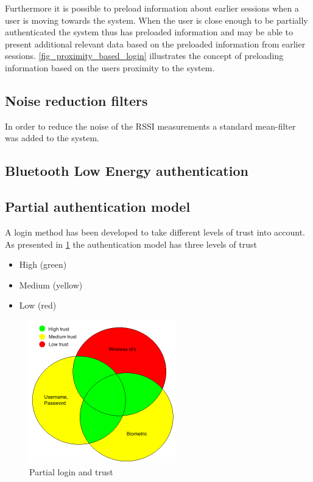 Furthermore it is possible to preload information about earlier sessions when a user is moving towards the system.
When the user is close enough to be partially authenticated the system thus has preloaded information and may be able to present additional relevant data based on the preloaded information from earlier sessions. 
\cref{fig_proximity_based_login} illustrates the concept of preloading information based on the users proximity to the system.

\subsection{Noise reduction filters}
In order to reduce the noise of the RSSI measurements a standard mean-filter was added to the system.

\subsection{Bluetooth Low Energy authentication}

\subsection{Partial authentication model}
A login method has been developed to take different levels of trust into account.
As presented in \cref{fig_authentication_model} the authentication model has three levels of trust
\begin{itemize}
\item High (green)
\item Medium (yellow)
\item Low (red)
\end{itemize}

\begin{figure}[!t]
	\centering
	\includegraphics[width=2.5in]{img/authenticationModel}
	\caption{ Partial login and trust }
	\label{fig_authentication_model}
\end{figure}

